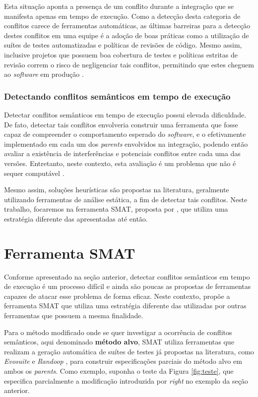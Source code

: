 \documentclass[12pt]{article}
\begin{document}
Esta situação aponta a presença de um conflito durante a integração que se manifesta apenas em tempo de execução. Como a detecção desta categoria de conflitos carece de ferramentas automáticas, as últimas barreiras para a detecção destes conflitos em uma equipe é a adoção de boas práticas como a utilização de suítes de testes automatizadas e políticas de revisões de código. Mesmo assim, inclusive projetos que possuem boa cobertura de testes e políticas estritas de revisão correm o risco de negligenciar tais conflitos, permitindo que estes cheguem ao \textit{software} em produção \cite{leuson:tese}.

\subsubsection{Detectando conflitos semânticos em tempo de execução}
Detectar conflitos semânticos em tempo de execução possui elevada dificuldade. De fato, detectar tais conflitos envolveria construir uma ferramenta que fosse capaz de compreender o comportamento esperado do \textit{software}, e o efetivamente implementado em cada um dos \textit{parents} envolvidos na integração, podendo então avaliar a existência de interferências e potenciais conflitos entre cada uma das versões. Entretanto, neste contexto, esta avaliação é um problema que não é sequer computável \cite{cavalcanti:icse}.

Mesmo assim, soluções heurísticas são propostas na literatura, geralmente utilizando ferramentas de análise estática, a fim de detectar tais conflitos. Neste trabalho, focaremos na ferramenta SMAT, proposta por \cite{leuson:icsme}, que utiliza uma estratégia diferente das apresentadas até então.

\section{Ferramenta SMAT} \label{smat}
Conforme apresentado na seção anterior, detectar conflitos semânticos em tempo de execução é um processo difícil e ainda são poucas as propostas de ferramentas capazes de atacar esse problema de forma eficaz. Neste contexto, \cite{leuson:icsme} propõe a ferramenta SMAT que utiliza uma estratégia diferente das utilizadas por outras ferramentas que possuem a mesma finalidade.

Para o método modificado onde se quer investigar a ocorrência de conflitos semânticos, aqui denominado \textbf{método alvo}, SMAT utiliza ferramentas que realizam a geração automática de suítes de testes já propostas na literatura, como \textit{Evosuite} \cite{evosuite:manual} e \textit{Randoop} \cite{randoop}, para construir especificações parciais do método alvo em ambos os \textit{parents}. Como exemplo, suponha o teste da Figura \ref{fig:teste}, que especifica parcialmente a modificação introduzida por \textit{right} no exemplo da seção anterior.
\end{document}
